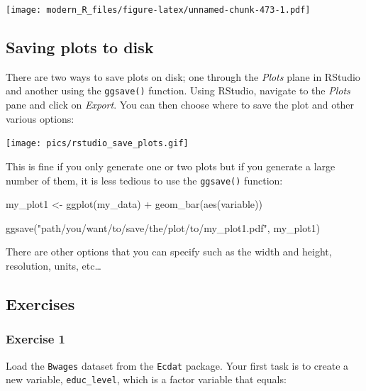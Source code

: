 \documentclass[
]{article}
\newenvironment{Shaded}{\begin{snugshade}}{\end{snugshade}}
\newcommand{\FunctionTok}[1]{\textcolor[rgb]{0.00,0.00,0.00}{#1}}
\newcommand{\NormalTok}[1]{#1}
\newcommand{\OtherTok}[1]{\textcolor[rgb]{0.56,0.35,0.01}{#1}}
\newcommand{\SpecialCharTok}[1]{\textcolor[rgb]{0.00,0.00,0.00}{#1}}
\newcommand{\StringTok}[1]{\textcolor[rgb]{0.31,0.60,0.02}{#1}}
\begin{document}
\texttt{[image: modern\_R\_files/figure-latex/unnamed-chunk-473-1.pdf]}

\hypertarget{saving-plots-to-disk}{%
\subsection{Saving plots to disk}\label{saving-plots-to-disk}}

There are two ways to save plots on disk; one through the \emph{Plots} plane in RStudio and another using the
\texttt{ggsave()} function. Using RStudio, navigate to the \emph{Plots} pane and click on \emph{Export}. You can
then choose where to save the plot and other various options:

\texttt{[image: pics/rstudio\_save\_plots.gif]}

This is fine if you only generate one or two plots but if you generate a large number of them, it
is less tedious to use the \texttt{ggsave()} function:

\begin{Shaded}
\begin{Highlighting}[]
\NormalTok{my\_plot1 }\OtherTok{\textless{}{-}} \FunctionTok{ggplot}\NormalTok{(my\_data) }\SpecialCharTok{+}
  \FunctionTok{geom\_bar}\NormalTok{(}\FunctionTok{aes}\NormalTok{(variable))}

\FunctionTok{ggsave}\NormalTok{(}\StringTok{"path/you/want/to/save/the/plot/to/my\_plot1.pdf"}\NormalTok{, my\_plot1)}
\end{Highlighting}
\end{Shaded}

There are other options that you can specify such as the width and height, resolution, units,
etc\ldots{}

\hypertarget{exercises-3}{%
\subsection{Exercises}\label{exercises-3}}

\hypertarget{exercise-1-3}{%
\subsubsection*{Exercise 1}\label{exercise-1-3}}

Load the \texttt{Bwages} dataset from the \texttt{Ecdat} package. Your first task is to create a new variable,
\texttt{educ\_level}, which is a factor variable that equals:
\end{document}
